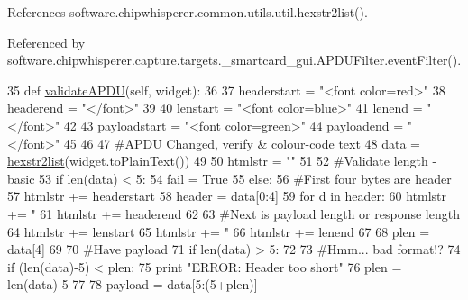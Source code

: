 References software.\+chipwhisperer.\+common.\+utils.\+util.\+hexstr2list().



Referenced by software.\+chipwhisperer.\+capture.\+targets.\+\_\+smartcard\+\_\+gui.\+A\+P\+D\+U\+Filter.\+event\+Filter().


\begin{DoxyCode}
35     \textcolor{keyword}{def }\hyperlink{classsoftware_1_1chipwhisperer_1_1capture_1_1targets_1_1__smartcard__gui_1_1APDUFilter_a7aae8aefbdc9d2d54c5d57c5d36e35f4}{validateAPDU}(self, widget):       
36          
37         headerstart = \textcolor{stringliteral}{"<font color=red>"}
38         headerend = \textcolor{stringliteral}{"</font>"}
39         
40         lenstart = \textcolor{stringliteral}{"<font color=blue>"}
41         lenend = \textcolor{stringliteral}{"</font>"}
42         
43         payloadstart = \textcolor{stringliteral}{"<font color=green>"}
44         payloadend = \textcolor{stringliteral}{"</font>"}
45         
46         
47         \textcolor{comment}{#APDU Changed, verify & colour-code text       }
48         data = \hyperlink{namespacesoftware_1_1chipwhisperer_1_1common_1_1utils_1_1util_ad2cd7abc81938c0de013778a8044d187}{hexstr2list}(widget.toPlainText())
49 
50         htmlstr = \textcolor{stringliteral}{""}
51 
52         \textcolor{comment}{#Validate length - basic}
53         \textcolor{keywordflow}{if} len(data) < 5:
54             fail = \textcolor{keyword}{True}
55         \textcolor{keywordflow}{else}:            
56             \textcolor{comment}{#First four bytes are header}
57             htmlstr += headerstart
58             header = data[0:4]
59             \textcolor{keywordflow}{for} d \textcolor{keywordflow}{in} header:
60                 htmlstr += \textcolor{stringliteral}{"%
61             htmlstr += headerend
62             
63             \textcolor{comment}{#Next is payload length or response length}
64             htmlstr += lenstart
65             htmlstr += \textcolor{stringliteral}{"%
66             htmlstr += lenend
67             
68             plen = data[4]
69             
70             \textcolor{comment}{#Have payload}
71             \textcolor{keywordflow}{if} len(data) > 5:
72                 
73                 \textcolor{comment}{#Hmm... bad format!?}
74                 \textcolor{keywordflow}{if} (len(data)-5) < plen:
75                     \textcolor{keywordflow}{print} \textcolor{stringliteral}{"ERROR: Header too short"}
76                     plen = len(data)-5
77                 
78                 payload = data[5:(5+plen)]
}}
\end{DoxyCode}
